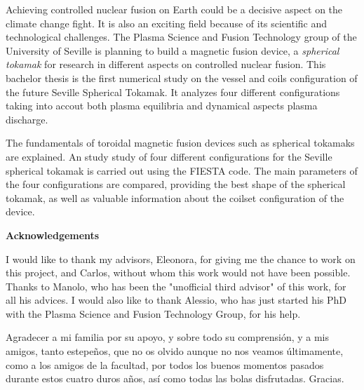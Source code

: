 \documentclass[a4paper,12pt,oneside]{book}
\begin{document}
Achieving controlled nuclear fusion on Earth could be a decisive aspect on the climate change fight. It is also an exciting field because of its scientific and technological challenges. The Plasma Science and Fusion Technology group of the University of Seville is planning to build a magnetic fusion device, a \textit{spherical tokamak} for research in different aspects on controlled nuclear fusion. This bachelor thesis is the first numerical study on the vessel and coils configuration of the future Seville Spherical Tokamak. It analyzes four different configurations taking into accout both plasma equilibria and dynamical aspects plasma discharge.

The fundamentals of toroidal magnetic fusion devices such as spherical tokamaks are explained. An study study of four different configurations for the Seville spherical tokamak is carried out using the FIESTA code. The main parameters of the four configurations are compared, providing the best shape of the spherical tokamak, as well as valuable information about the coilset configuration of the device.


\newpage

\begin{center}
\begin{large}
\textbf{Acknowledgements}
\end{large}

\end{center}

I would like to thank my advisors, Eleonora, for giving me the chance to work on this project, and Carlos, without whom this work would not have been possible. Thanks to Manolo, who has been the "unofficial third advisor" of this work, for all his advices. I would also like to thank Alessio, who has just started his PhD with the Plasma Science and Fusion Technology Group, for his help.

Agradecer a mi familia por su apoyo, y sobre todo su comprensión, y a mis amigos, tanto estepeños, que no os olvido aunque no nos veamos últimamente, como a los amigos de la facultad, por todos los buenos momentos pasados durante estos cuatro duros años, así como todas las bolas disfrutadas. Gracias.







\tableofcontents %
\cleardoublepage %
\end{document}
